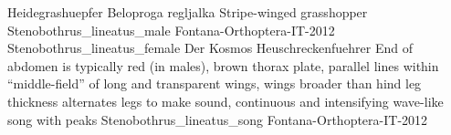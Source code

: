 {Heidegrashuepfer} %
{Beloproga regljalka} %
{Stripe-winged grasshopper} %
{Stenobothrus_lineatus_male} %
{Fontana-Orthoptera-IT-2012} %
{Stenobothrus_lineatus_female} %
{Der Kosmos Heuschreckenfuehrer} %
{End of abdomen is typically red (in males), brown thorax plate, parallel lines within “middle-field” of long and transparent wings, wings broader than hind leg thickness} %
{alternates legs to make sound, continuous and intensifying wave-like song with peaks} %
{Stenobothrus_lineatus_song} %
{Fontana-Orthoptera-IT-2012} %

